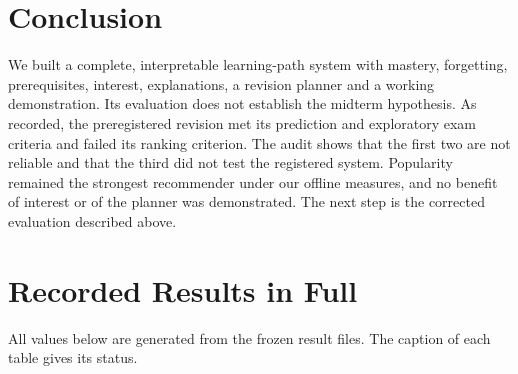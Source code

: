 \documentclass[conference]{IEEEtran}
\begin{document}
\section{Conclusion}
We built a complete, interpretable learning-path system with mastery, forgetting, prerequisites, interest, explanations, a revision planner and a working demonstration. Its evaluation does not establish the midterm hypothesis. As recorded, the preregistered revision met its prediction and exploratory exam criteria and failed its ranking criterion. The audit shows that the first two are not reliable and that the third did not test the registered system. Popularity remained the strongest recommender under our offline measures, and no benefit of interest or of the planner was demonstrated. The next step is the corrected evaluation described above.

\appendices
\section{Recorded Results in Full}
All values below are generated from the frozen result files. The caption of each table gives its status.














\end{document}
